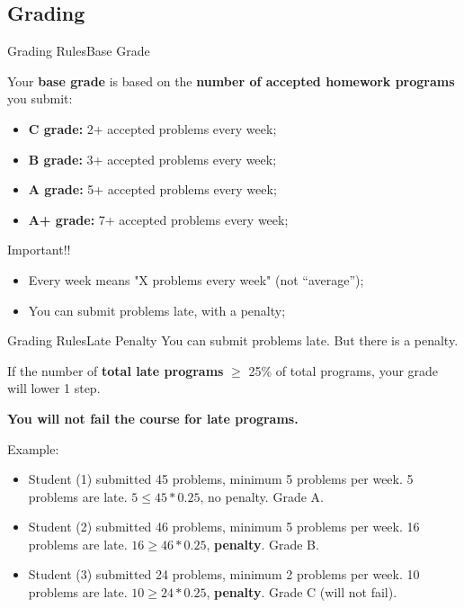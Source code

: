 \subsection{Grading}
\begin{frame}{Grading Rules}{Base Grade}

  Your {\bf base grade} is based on the {\bf number of accepted homework programs} you submit:

  \begin{itemize}
    \item {\bf C grade:} 2+ accepted problems every week;
    \item {\bf B grade:} 3+ accepted problems every week;
    \item {\bf A grade:} 5+ accepted problems every week;
    \item {\bf A+ grade:} 7+ accepted problems every week;
  \end{itemize}\bigskip

  \begin{alertblock}{Important!!}
    \begin{itemize}
      \item Every week means "X problems every week" (not ``average'');
      \item You can submit problems late, with a penalty;
    \end{itemize}
  \end{alertblock}
\end{frame}

\begin{frame}{Grading Rules}{Late Penalty}
  You can submit problems late. But there is a penalty.\bigskip

  If the number of {\bf total late programs} $\ge$ 25\% of total programs, your grade will lower 1 step.\bigskip

  {\bf You will not fail the course for late programs.}

  \begin{exampleblock}{Example:}
    \begin{itemize}
      \item Student (1) submitted 45 problems, minimum 5 problems per week. 5 problems are late. $5 \le 45*0.25$, no penalty. Grade A.
      \item Student (2) submitted 46 problems, minimum 5 problems per week. 16 problems are late. $16 \ge 46*0.25$, {\bf penalty}. Grade B.
      \item Student (3) submitted 24 problems, minimum 2 problems per week. 10 problems are late. $10 \ge 24*0.25$, {\bf penalty}. \alert{Grade C (will not fail)}.
    \end{itemize}
  \end{exampleblock}
\end{frame}


